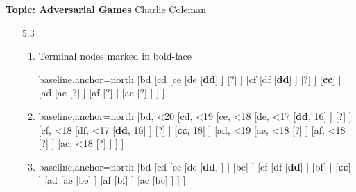 \documentclass{article}
\begin{document}
	\noindent\begin{large}\textbf{Topic: Adversarial Games} \hfill Charlie Coleman\end{large}
	
	\begin{enumerate}
		\item[5.3] \begin{enumerate}
			\item Terminal nodes marked in bold-face\\\begin{forest}
				baseline,anchor=north
				[bd
					[cd
						[ce 
							[de 
								[\textbf{dd}]
							]
							[?]
						]
						[cf 
							[df
								[\textbf{dd}]
							]
							[?]
						]
						[\textbf{cc}]
					]
					[ad
						[ae
							[?]
						]
						[af
							[?]
						]
						[ac
							[?]
						]
					]
				]
			\end{forest}
			\item \begin{forest}
				baseline,anchor=north
				[{bd, \textless20}
					[{cd, \textless19}
						[{ce, \textless18} 
							[{de, \textless17} 
								[{\textbf{dd}, 16}]
							]
							[?]
						]
						[{cf, \textless18}
							[{df, \textless17}
								[{\textbf{dd}, 16}]
							]
							[?]
						]
						[{\textbf{cc}, 18}]
					]
					[{ad, \textless19}
						[{ae, \textless18}
							[?]
						]
						[{af, \textless18}
							[?]
						]
						[{ac, \textless18}
							[?]
						]
					]
				]
			\end{forest}
			\item \begin{forest}
				baseline,anchor=north
				[bd
					[cd
						[ce 
							[de 
								[\textbf{dd}, ]
							]
							[be]
						]
						[cf 
							[df
								[\textbf{dd}]
							]
							[bf]
						]
						[\textbf{cc}]
					]
					[ad
						[ae
							[be]
						]
						[af
							[bf]
						]
						[ac
							[bc]
						]
					]
				]
			\end{forest}
		\end{enumerate}
	\end{enumerate}
	
\end{document}
